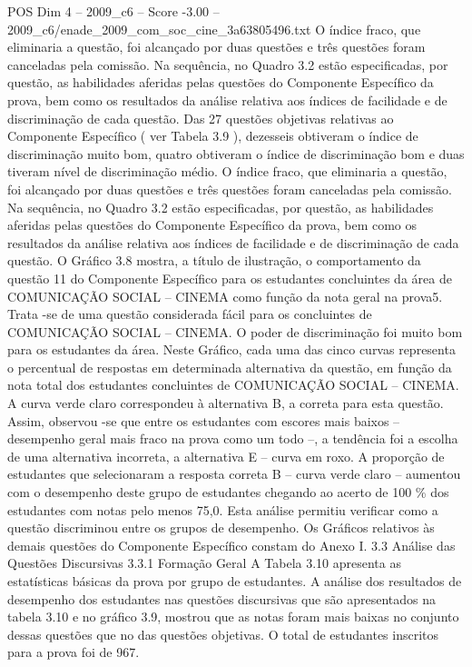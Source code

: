 \begin{textsample}{POS Dim 4 – 2009\_c6 – Score -3.00 – 2009\_c6/enade\_2009\_com\_soc\_cine\_3a63805496.txt}
O índice fraco, que eliminaria a questão, foi alcançado por duas questões e três questões foram canceladas pela comissão.
Na sequência, no Quadro 3.2 estão especificadas, por questão, as habilidades aferidas pelas questões do Componente Específico da prova, bem como os resultados da análise relativa aos índices de facilidade e de discriminação de cada questão.
Das 27 questões objetivas relativas ao Componente Específico ( ver Tabela 3.9 ), dezesseis obtiveram o índice de discriminação muito bom, quatro obtiveram o índice de discriminação bom e duas tiveram nível de discriminação médio.
O índice fraco, que eliminaria a questão, foi alcançado por duas questões e três questões foram canceladas pela comissão.
Na sequência, no Quadro 3.2 estão especificadas, por questão, as habilidades aferidas pelas questões do Componente Específico da prova, bem como os resultados da análise relativa aos índices de facilidade e de discriminação de cada questão.
O Gráfico 3.8 mostra, a título de ilustração, o comportamento da questão 11 do Componente Específico para os estudantes concluintes da área de COMUNICAÇÃO SOCIAL – CINEMA como função da nota geral na prova5.
Trata -se de uma questão considerada fácil para os concluintes de COMUNICAÇÃO SOCIAL – CINEMA.
O poder de discriminação foi muito bom para os estudantes da área.
Neste Gráfico, cada uma das cinco curvas representa o percentual de respostas em determinada alternativa da questão, em função da nota total dos estudantes concluintes de COMUNICAÇÃO SOCIAL – CINEMA.
A curva verde claro correspondeu à alternativa B, a correta para esta questão.
Assim, observou -se que entre os estudantes com escores mais baixos – desempenho geral mais fraco na prova como um todo –, a tendência foi a escolha de uma alternativa incorreta, a alternativa E – curva em roxo.
A proporção de estudantes que selecionaram a resposta correta B – curva verde claro – aumentou com o desempenho deste grupo de estudantes chegando ao acerto de 100 \% dos estudantes com notas pelo menos 75,0.
Esta análise permitiu verificar como a questão discriminou entre os grupos de desempenho.
Os Gráficos relativos às demais questões do Componente Específico constam do Anexo I. 3.3 Análise das Questões Discursivas 3.3.1 Formação Geral A Tabela 3.10 apresenta as estatísticas básicas da prova por grupo de estudantes.
A análise dos resultados de desempenho dos estudantes nas questões discursivas que são apresentados na tabela 3.10 e no gráfico 3.9, mostrou que as notas foram mais baixas no conjunto dessas questões que no das questões objetivas.
O total de estudantes inscritos para a prova foi de 967.

\end{textsample}
